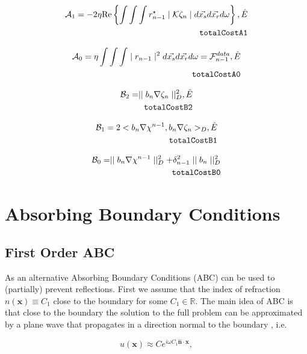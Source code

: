 \documentclass[10pt,a4paper]{article}
\newcommand{\real}[1]{\text{Re} \left\{ #1 \right\}}
\newcommand{\x}{\mathbf{x}}
\newcommand{\n}{\mathbf{n}}
\begin{document}
\begin{align} \label{eq:totalCostA1} \mathcal{A}_1 = -2 \eta \real{\int
\int \int r^{\star}_{n-1} \mid \mathcal{K} \zeta_n \mid
d\vec{x_s}d\vec{x_r}d\omega} , \hat{E}\\
\tag*{\texttt{totalCostA1}}
\end{align}

\begin{align} \label{eq:totalCostA0} \mathcal{A}_0 = \eta \int \int \int
\mid r_{n-1} \mid^2 d\vec{x_s}d\vec{x_r}d\omega =
\mathcal{F}^{data}_{n-1} , \hat{E}\\
\tag*{\texttt{totalCostA0}}
 \end{align}

\begin{align} \label{eq:totalCostB2} \mathcal{B}_2 = \mid \mid b_n \nabla
\zeta_n \mid \mid^{2}_D , \hat{E}\\
\tag*{\texttt{totalCostB2}}
\end{align}

\begin{align} \label{eq:totalCostB1} \mathcal{B}_1 = 2 < b_n
\nabla\chi^{n-1}, b_n \nabla \zeta_n >_D, \hat{E}\\
\tag*{\texttt{totalCostB1}}
\end{align}

\begin{align} \label{eq:totalCostB0} \mathcal{B}_0 = \mid \mid b_n \nabla
\chi^{n-1} \mid \mid^{2}_D + \delta^{2}_{n-1} \mid \mid b_n \mid
\mid^{2}_D\\
\tag*{\texttt{totalCostB0}}
\end{align}

\section{Absorbing Boundary Conditions}\label{sec:ABC}
\subsection{First Order ABC}
As an alternative Absorbing Boundary Conditions (ABC) can be used to (partially) prevent reflections. First we assume that the index of refraction $n(\x)\equiv C_1$ close to the boundary for some $C_1\in \mathbb{R}$. The main idea of ABC is that close to the boundary the solution to the full problem can be approximated by a plane wave that propagates in a direction normal to the boundary \cite{LectNotes}, i.e.

\begin{equation}
u(\x) \approx Ce^{i\omega C_1 \hat{\n}\cdot \x},
\end{equation}
\end{document}
